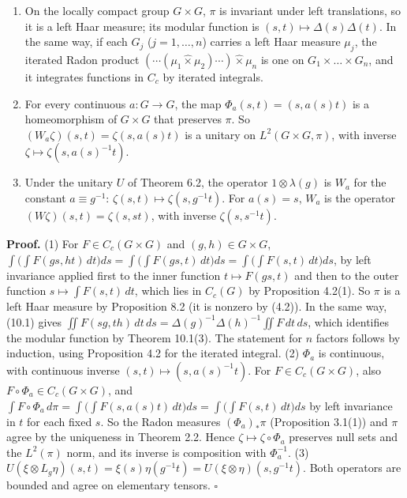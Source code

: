 \documentclass[
  english,
  11pt,
  a4paper,
]{article}
\providecommand{\tightlist}{%
  \setlength{\itemsep}{0pt}\setlength{\parskip}{0pt}}
\begin{document}
\begin{enumerate}
\tightlist
\item
  On the locally compact group \(G\times G\), \(\pi\) is invariant under
  left translations, so it is a left Haar measure; its modular function
  is \((s,t)\mapsto\Delta(s)\Delta(t)\). In the same way, if each
  \(G_j\) (\(j=1,\dots,n\)) carries a left Haar measure \(\mu_j\), the
  iterated Radon product
  \((\cdots(\mu_1\hat\times\mu_2)\cdots)\hat\times\mu_n\) is one on
  \(G_1\times\dots\times G_n\), and it integrates functions in \(C_c\)
  by iterated integrals.
\item
  For every continuous \(a\colon G\to G\), the map
  \(\Phi_a(s,t)=(s,a(s)t)\) is a homeomorphism of \(G\times G\) that
  preserves \(\pi\). So \((W_a\zeta)(s,t)=\zeta(s,a(s)t)\) is a unitary
  on \(L^2(G\times G,\pi)\), with inverse
  \(\zeta\mapsto\zeta(s,a(s)^{-1}t)\).
\item
  Under the unitary \(U\) of Theorem 6.2, the operator
  \(1\otimes\lambda(g)\) is \(W_a\) for the constant \(a\equiv g^{-1}\):
  \(\zeta(s,t)\mapsto\zeta(s,g^{-1}t)\). For \(a(s)=s\), \(W_a\) is the
  operator \((W\zeta)(s,t)=\zeta(s,st)\), with inverse
  \(\zeta(s,s^{-1}t)\).
\end{enumerate}

\textbf{Proof.} (1) For \(F\in C_c(G\times G)\) and
\((g,h)\in G\times G\),
\(\int\big(\int F(gs,ht)\,dt\big)ds=\int\big(\int F(gs,t)\,dt\big)ds=\int\big(\int F(s,t)\,dt\big)ds\),
by left invariance applied first to the inner function
\(t\mapsto F(gs,t)\) and then to the outer function
\(s\mapsto\int F(s,t)\,dt\), which lies in \(C_c(G)\) by Proposition
4.2(1). So \(\pi\) is a left Haar measure by Proposition 8.2 (it is
nonzero by (4.2)). In the same way, (10.1) gives
\(\iint F(sg,th)\,dt\,ds=\Delta(g)^{-1}\Delta(h)^{-1}\iint F\,dt\,ds\),
which identifies the modular function by Theorem 10.1(3). The statement
for \(n\) factors follows by induction, using Proposition 4.2 for the
iterated integral. (2) \(\Phi_a\) is continuous, with continuous inverse
\((s,t)\mapsto(s,a(s)^{-1}t)\). For \(F\in C_c(G\times G)\), also
\(F\circ\Phi_a\in C_c(G\times G)\), and
\(\int F\circ\Phi_a\,d\pi=\int\big(\int F(s,a(s)t)\,dt\big)ds=\int\big(\int F(s,t)\,dt\big)ds\)
by left invariance in \(t\) for each fixed \(s\). So the Radon measures
\((\Phi_a)_*\pi\) (Proposition 3.1(1)) and \(\pi\) agree by the
uniqueness in Theorem 2.2. Hence \(\zeta\mapsto\zeta\circ\Phi_a\)
preserves null sets and the \(L^2(\pi)\) norm, and its inverse is
composition with \(\Phi_a^{-1}\). (3)
\(U(\xi\otimes L_g\eta)(s,t)=\xi(s)\eta(g^{-1}t)=U(\xi\otimes\eta)(s,g^{-1}t)\).
Both operators are bounded and agree on elementary tensors. \(\square\)
\end{document}
